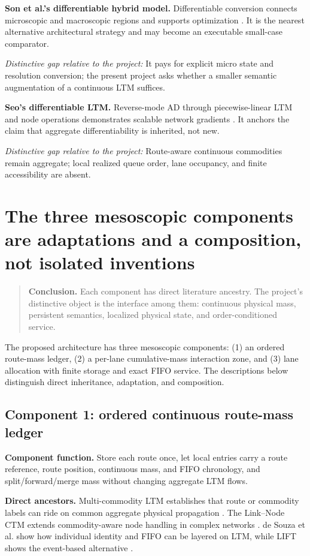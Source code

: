 \documentclass[11pt,a4paper]{article}
\newcommand{\keypoint}[1]{\begin{quote}\colorbox{bluegray}{\parbox{0.93\linewidth}{\textbf{Conclusion.} #1}}\end{quote}}
\newcommand{\gap}[1]{\par\smallskip\noindent\textit{Distinctive gap relative to the project:} #1}
\begin{document}
\textbf{Son et al.'s differentiable hybrid model.} Differentiable conversion connects microscopic and macroscopic regions and supports optimization \cite{son2022}. It is the nearest alternative architectural strategy and may become an executable small-case comparator. \gap{It pays for explicit micro state and resolution conversion; the present project asks whether a smaller semantic augmentation of a continuous LTM suffices.}

\textbf{Seo's differentiable LTM.} Reverse-mode AD through piecewise-linear LTM and node operations demonstrates scalable network gradients \cite{seo2026}. It anchors the claim that aggregate differentiability is inherited, not new. \gap{Route-aware continuous commodities remain aggregate; local realized queue order, lane occupancy, and finite accessibility are absent.}

\section{The three mesoscopic components are adaptations and a composition, not isolated inventions}

\keypoint{Each component has direct literature ancestry. The project's distinctive object is the interface among them: continuous physical mass, persistent semantics, localized physical state, and order-conditioned service.}

The proposed architecture has three mesoscopic components: (1) an ordered route-mass ledger, (2) a per-lane cumulative-mass interaction zone, and (3) lane allocation with finite storage and exact FIFO service. The descriptions below distinguish direct inheritance, adaptation, and composition.

\subsection{Component 1: ordered continuous route-mass ledger}

\textbf{Component function.} Store each route once, let local entries carry a route reference, route position, continuous mass, and FIFO chronology, and split/forward/merge mass without changing aggregate LTM flows.

\textbf{Direct ancestors.} Multi-commodity LTM establishes that route or commodity labels can ride on common aggregate physical propagation \cite{yperman2007}. The Link--Node CTM extends commodity-aware node handling in complex networks \cite{wright2015lnctm}. de Souza et al. show how individual identity and FIFO can be layered on LTM, while LIFT shows the event-based alternative \cite{desouza2025,nietal2026}.
\end{document}

